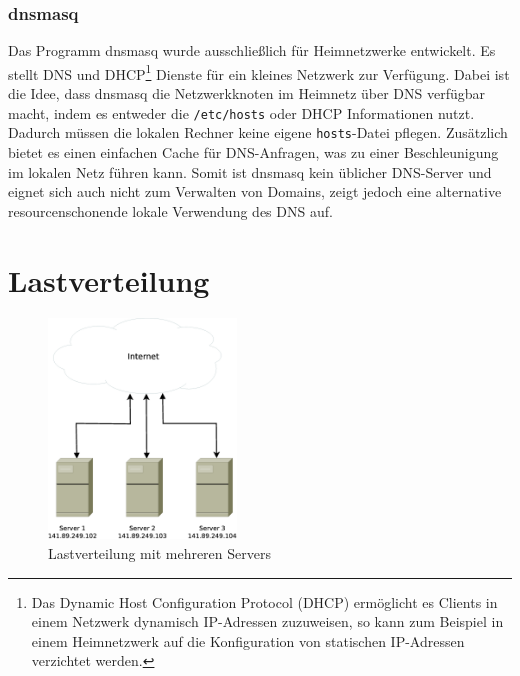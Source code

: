 \documentclass[a4paper, 12pt, BCOR10mm, DIV12, toc=bibliography, toc=listof, german]{scrbook}
\begin{document}

				\subsubsection*{dnsmasq} %

				Das Programm dnsmasq \cite{dnsmasq} wurde ausschließlich für Heimnetzwerke entwickelt. Es
				stellt DNS und DHCP\footnote{Das Dynamic Host Configuration Protocol (DHCP) \cite{rfc2131}
				ermöglicht es Clients in einem Netzwerk dynamisch IP-Adressen zuzuweisen, so kann zum
				Beispiel in einem Heimnetzwerk auf die Konfiguration von statischen IP-Adressen verzichtet
				werden.} Dienste für ein kleines Netzwerk zur Verfügung. Dabei ist die Idee, dass dnsmasq
				die Netzwerkknoten im Heimnetz über DNS verfügbar macht, indem es entweder die
				\texttt{/etc/hosts} oder DHCP Informationen nutzt. Dadurch müssen die lokalen Rechner keine
				eigene \texttt{hosts}-Datei pflegen.  Zusätzlich bietet es einen einfachen Cache für
				DNS-Anfragen, was zu einer Beschleunigung im lokalen Netz führen kann. Somit ist dnsmasq
				kein üblicher DNS-Server und eignet sich auch nicht zum Verwalten von Domains, zeigt jedoch
				eine alternative resourcenschonende lokale Verwendung des DNS auf.
				


			

		\section{Lastverteilung} %
		\label{sec:lastverteilung}

		\begin{figure}
			\centering
			\includegraphics[width=5cm]{images/internet-server}
			\caption{Lastverteilung mit mehreren Servers}
			\label{fig:lastverteilung}
		\end{figure}
\end{document}
